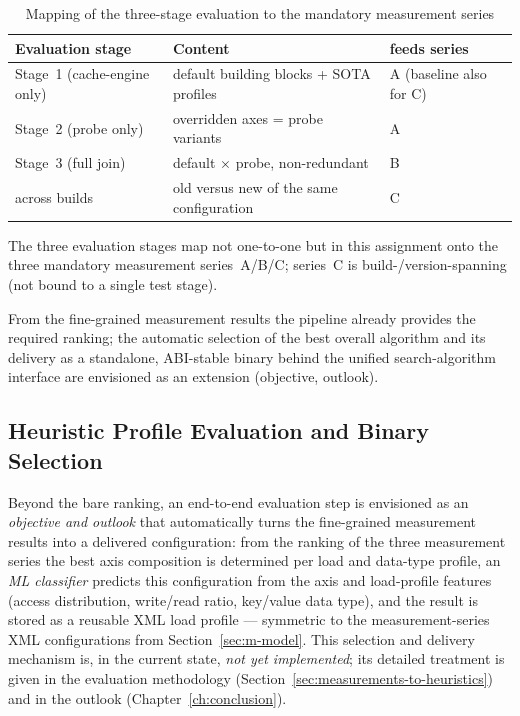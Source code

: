 \begin{table}[!htbp]
  \centering
  \caption{Mapping of the three-stage evaluation to the mandatory measurement series}\label{tab:stage-series}
  \begin{tabular}{@{}lll@{}}
    \toprule
    \textbf{Evaluation stage} & \textbf{Content} & \textbf{feeds series} \\
    \midrule
    Stage~1 (cache-engine only) & default building blocks + SOTA profiles & A (baseline also for C) \\
    Stage~2 (probe only) & overridden axes = probe variants & A \\
    Stage~3 (full join) & default $\times$ probe, non-redundant & B \\
    across builds & old versus new of the same configuration & C \\
    \bottomrule
  \end{tabular}

  \smallskip
  {\footnotesize The three evaluation stages map not one-to-one but in this assignment onto the three
  mandatory measurement series~A/B/C\@; series~C is build-/version-spanning (not bound to a single
  test stage).\par}
\end{table}

From the
fine-grained measurement results the pipeline already provides the required ranking; the automatic
selection of the best overall algorithm and its delivery as a standalone, ABI-stable binary behind
the unified search-algorithm interface are envisioned as an extension (objective, outlook).

\subsection{Heuristic Profile Evaluation and Binary Selection}\label{sec:heuristic-profile-selection}

Beyond the bare ranking, an end-to-end evaluation step is envisioned as an \emph{objective and
outlook} that automatically turns the fine-grained measurement results into a delivered
configuration: from the ranking of the three measurement series the best axis composition is
determined per load and data-type profile, an \emph{ML classifier} predicts this configuration from
the axis and load-profile features (access distribution, write/read ratio, key/value data type), and
the result is stored as a reusable XML load profile --- symmetric to the measurement-series XML
configurations from Section~\ref{sec:m-model}. This selection and delivery mechanism is, in the
current state, \emph{not yet implemented}; its detailed treatment is given in the evaluation
methodology (Section~\ref{sec:measurements-to-heuristics}) and in the outlook (Chapter~\ref{ch:conclusion}).
